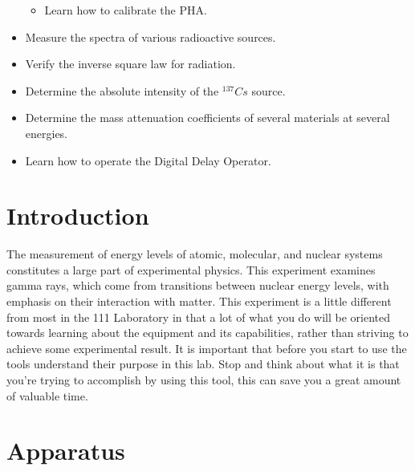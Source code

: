 \documentclass{../lab}
\begin{document}
\begin{itemize}
\begin{itemize}
        \item Learn how to calibrate the PHA.

    \end{itemize}

    \item Measure the spectra of various radioactive sources.

    \item Verify the inverse square law for radiation.

    \item Determine the absolute intensity of the $^{137}Cs$ source.

    \item Determine the mass attenuation coefficients of several materials at several energies.

    \item Learn how to operate the Digital Delay Operator.

\end{itemize}

\section{Introduction}

The measurement of energy levels of atomic, molecular, and nuclear systems constitutes a large part of experimental physics. This experiment examines gamma rays, which come from transitions between nuclear energy levels, with emphasis on their interaction with matter. This experiment is a little different from most in the 111 Laboratory in that a lot of what you do will be oriented towards learning about the equipment and its capabilities, rather than striving to achieve some experimental result. It is important that before you start to use the tools understand their purpose in this lab. Stop and think about what it is that you're trying to accomplish by using this tool, this can save you a great amount of valuable time.

\section{Apparatus}
\end{document}
